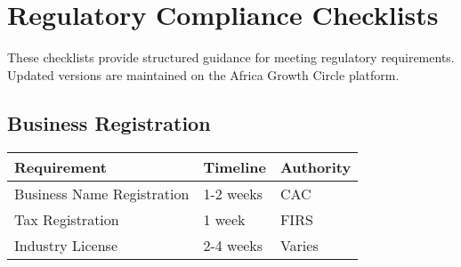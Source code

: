
\chapter{Regulatory Compliance Checklists}

\begin{importantbox}
    These checklists provide structured guidance for meeting regulatory requirements. Updated versions are maintained on the Africa Growth Circle platform.
\end{importantbox}


\section{Business Registration}
\begin{center}
    \begin{tabular}{p{}|p{}|p{}}
        \textbf{Requirement}       & \textbf{Timeline} & \textbf{Authority} \\
        \hline
        Business Name Registration & 1-2 weeks         & CAC                \\
        Tax Registration           & 1 week            & FIRS               \\
        Industry License           & 2-4 weeks         & Varies             \\
    \end{tabular}
\end{center}